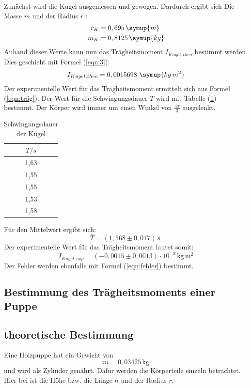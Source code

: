 Zunächst wird die Kugel ausgemessen und gewogen. Dardurch ergibt sich Die Masse $m$
und der Radius $r$ :
\begin{align*}
r_K &= 0,695 \, \symup{m} \\
m_K &= 0,8125 \, \symup{kg}
\end{align*}
Anhand dieser Werte kann nun das Trägheitsmoment $I_{Kugel, theo}$ bestimmt werden.
Dies geschieht mit Formel (\ref{eqn:3}):
\begin{equation*}
I_{Kugel,theo}= 0,0015698 \, \, \symup{kg \, m^2}
\end{equation*}
Der experimentelle Wert für das Trägheitsmoment ermittelt sich aus Formel (\ref{eqn:träg}).
Der Wert für die Schwingungsdauer $T$ wird mit Tabelle (\ref{tab:schw}) bestimmt.
Der Körper wird immer um einen Winkel von $ \frac{4\pi}{3}$ ausgelenkt.

\begin{table}
\centering
\caption{Schwingungsdauer der Kugel}
\label{tab:schw}
\begin{tabular}{c}
\toprule
$T/s$ \\
\midrule
1,63\\
1,55\\
1,55\\
1,53\\
1,58\\
\bottomrule
\end{tabular}
\end{table}
Für den Mittelwert ergibt sich:
\begin{equation*}
\bar{T}= (1{,}568 \pm 0{,}017) \, \mathrm{s} .
\end{equation*}
Der experimentelle Wert für das Trägheitsmoment lautet somit:
\begin{equation*}
I_{Kugel,exp}= (-0,0015 \pm 0,0013) \cdot 10^{-3} \, \mathrm{kg \, m^2} %
\end{equation*}
Der Fehler werden ebenfalls mit Formel (\ref{eqn:fehler}) bestimmt.
\subsection{Bestimmung des Trägheitsmoments einer Puppe}

\subsection{theoretische Bestimmung}

Eine Holzpuppe hat ein Gewicht von
\begin{equation*}
m= 0,03425 \, \mathrm{kg}
\end{equation*}
und wird als Zylinder genährt.
Dafür werden die Körperteile einzeln betrachtet.
Hier bei ist die Höhe bzw. die Länge  $h$ und der Radius $r$. \\

